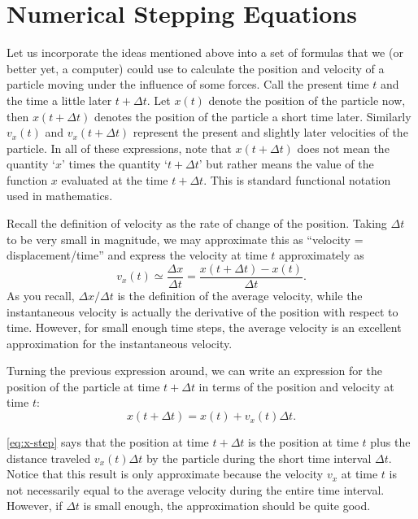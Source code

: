 \section{Numerical Stepping Equations}

Let us incorporate the ideas mentioned above into a set of formulas
that we (or better yet, a computer) could use to calculate the
position and velocity of a particle moving under the influence of some
forces.  Call the present time $t$ and the time a little later $t +
\Delta t$.  Let $x(t)$ denote the position of the particle now, then
$x(t + \Delta t)$ denotes the position of the particle a short time
later.  Similarly $v_x(t)$ and $v_x(t + \Delta t)$ represent the present
and slightly later velocities of the particle.  In all of these
expressions, note that $x(t + \Delta t)$ does not mean the quantity
`$x$' times the quantity `$t + \Delta t$' but rather means the value
of the function $x$ evaluated at the time $t + \Delta t$.  This is
standard functional notation used in mathematics.

Recall the definition of velocity as the rate of change of the
position.  Taking $\Delta t$ to be very small in magnitude, we may
approximate this as ``velocity = displacement/time'' and
express the velocity at time $t$ approximately as
\begin{equation}
  v_x(t) \simeq \frac{\Delta x}{\Delta t} = \frac{x(t+\Delta t) - x(t)}
  {\Delta t}.
\end{equation}
As you recall, $\Delta x/\Delta t$ is the definition of the average
velocity, while the instantaneous velocity is actually the derivative
of the position with respect to time.  However, for small enough time
steps, the average velocity is an excellent approximation for the
instantaneous velocity.

Turning the previous expression around, we can write an expression for
the position of the particle at time $t + \Delta t$ in terms of the
position and velocity at time $t$:
\begin{equation}
  x(t+\Delta t) = x(t) + v_x(t)\Delta t.
  \label{eq:x-step}
\end{equation}

\eqref{eq:x-step} says that the position at time $t + \Delta t$ is
the position at time $t$ plus the distance traveled $v_x(t)\Delta t$ by
the particle during the short time interval $\Delta t$.  Notice that
this result is only approximate because the velocity $v_x$ at time $t$
is not necessarily equal to the average velocity during the entire
time interval.  However, if $\Delta t$ is small enough, the
approximation should be quite good.
   
